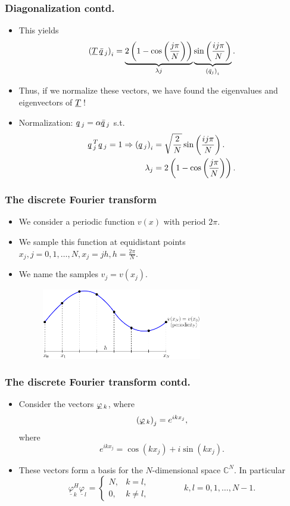 \documentclass{beamer}
\newcommand{\ub}[1]{\underbar{$#1$}\,}
\begin{document}
\begin{frame}\frametitle{Diagonalization contd.}
  \begin{itemize}
    \item This yields
      \[
        \left(\ub{T}\ub{\bar{q}}_j\right)_i = \underbrace{2\left(1-\cos\left(\frac{j\pi}{N}\right)\right)}_{\lambda j}\underbrace{\sin\left(\frac{ij\pi}{N}\right)}_{\left(\bar{q}_j\right)_i}.
      \]
     \item Thus, if we normalize these vectors, we have found the eigenvalues and eigenvectors of $\ub{T}$!
     \item Normalization: $\ub{q}_j = \alpha\ub{\bar{q}}_j$ s.t.
       \[
         \begin{split}
           \ub{q}_j^T\ub{q}_j = 1 \Rightarrow
           \left(\ub{q}_j\right)_i &= \sqrt{\frac{2}{N}}\sin\left(\frac{ij\pi}{N}\right). \\ 
                         \lambda_j &= 2\left(1-\cos\left(\frac{j\pi}{N}\right)\right).
         \end{split}
       \]
  \end{itemize}
\end{frame}
\begin{frame}\frametitle{The discrete Fourier transform}
  \begin{itemize}
    \item We consider a periodic function $v(x)$ with period $2\pi$.
    \item We sample this function at equidistant points $x_j, j=0,1, \ldots, N, x_j = jh, h=\frac{2\pi}{N}$.
    \item We name the samples $v_j = v\left(x_j\right)$.
      \begin{figure}[H]
        \centering
        \includegraphics[width=7cm]{../../notes/08.poisson-diag/PeriodicFunction}
      \end{figure}
  \end{itemize}
\end{frame}
\begin{frame}\frametitle{The discrete Fourier transform contd.}
  \begin{itemize}
    \item Consider the vectors $\ub{\varphi}_k$, where
      \[
        \left(\ub{\varphi}_k\right)_j = e^{ikx_j},
      \]
      where
      \[
        e^{ikx_j} = \cos\left(kx_j\right)+i\sin\left(kx_j\right).
      \]
    \item These vectors form a basis for the $N$-dimensional space $\mathbb{C}^N$.
        In particular
        \[
          \underline{\varphi}_k^H \underline{\varphi}_l = 
          \begin{cases}
            N, & k=l, \\
            0, & k \not= l,
          \end{cases}
          \qquad \qquad k,l=0,1,\ldots,N-1.
        \]
  \end{itemize}
\end{frame}
\end{document}
